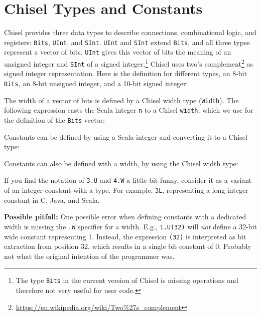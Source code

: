 \documentclass[%
    10pt,
    headinclude, footexclude,
    openright, %
    notitlepage,
    cleardoubleempty,
    headsepline,
    pointlessnumbers,
    bibtotoc, idxtotoc,
    ]{scrbook}
\newcommand{\code}[1]{{\lstinline[basicstyle=\small\ttfamily]{#1}}}
\newcommand{\codefoot}[1]{{\lstinline[basicstyle=\footnotesize\ttfamily]{#1}}}
\newcommand{\myref}[2]{\href{#1}{#2}}
\renewcommand{\myref}[2]{{#2}{\footnote{\url{#1}}}}
\begin{document}
\section{Chisel Types and Constants}

Chisel provides three data types to describe connections, combinational logic, and registers:
\code{Bits}, \code{UInt}, and \code{SInt}. \code{UInt} and \code{SInt} extend \code{Bits},
and all three types represent a vector of bits. \code{UInt} gives this vector of
bits the meaning of an unsigned integer and \code{SInt} of a signed
integer.\footnote{The type \codefoot{Bits} in the current version of Chisel is missing operations and
therefore not very useful for user code.}
Chisel uses \myref{https://en.wikipedia.org/wiki/Two\%27s\_complement}{two's complement}
as signed integer representation.
Here is the definition for different types, an 8-bit \code{Bits}, an 8-bit unsigned integer, and a 10-bit
signed integer:


\noindent The width of a vector of bits is defined by a Chisel width type (\code{Width}).
The following expression casts the Scala integer \code{n} to a Chisel \code{width},
which we use for the definition of the \code{Bits} vector:




\noindent Constants can be defined by using a Scala integer and converting it to a Chisel type:


\noindent Constants can also be defined with a width, by using the Chisel width type:


\noindent If you find the notation of \code{3.U} and \code{4.W} a little bit funny, consider it as a variant of an integer
constant with a type. For example, \code{3L}, representing a long integer constant in C, Java, and Scala.

{\bf Possible pitfall:} One possible error when defining constants with a dedicated width is missing the \code{.W}
specifier for a width. E.g., \code{1.U(32)} will \emph{not} define a 32-bit wide constant representing 1.
Instead, the expression \code{(32)} is interpreted as bit extraction from position 32, which results
in a single bit constant of 0. Probably not what the original intention of the programmer was.
\end{document}
